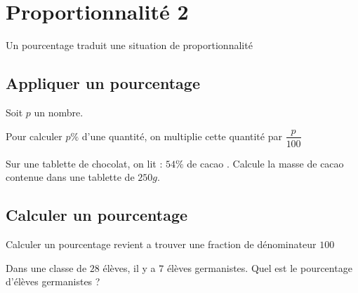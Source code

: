 \documentclass[a4paper,10pt]{report}
\begin{document}
\newpage
\setcounter{chapter}{10}
\chapter{Proportionnalité 2}

\begin{prop}
Un pourcentage traduit une situation de proportionnalité
\end{prop}

\section{Appliquer un pourcentage}

\begin{defn}
Soit $p$ un nombre.

\medskip
\noindent Pour calculer $p\%$ d'une quantité, on multiplie cette quantité par $\dfrac{p}{100}$ 
\end{defn}

\begin{ex}
Sur une tablette de chocolat, on lit : \og $54 \%$ de cacao \fg{}. Calcule la masse de cacao contenue dans une tablette de $250g$.

\vspace{-2mm}
\begin{meth}
\noindent\grandscarreaux{\linewidth}{3.2cm}
\end{meth}

\vspace{-1mm}
\begin{meth}
\noindent\grandscarreaux{\linewidth}{2.4cm}
\end{meth}
\end{ex}

\section{Calculer un pourcentage}

\begin{defn}
Calculer un pourcentage revient a trouver une fraction de dénominateur $100$
\end{defn}

\begin{ex}
Dans une classe de $28$ élèves, il y a $7$ élèves germanistes. Quel est le pourcentage d'élèves germanistes ?


\begin{meth}
\noindent\grandscarreaux{\linewidth}{2.4cm}
\end{meth}

\begin{meth}
\noindent\grandscarreaux{\linewidth}{2.4cm}
\end{meth}
\end{ex}
\end{document}
